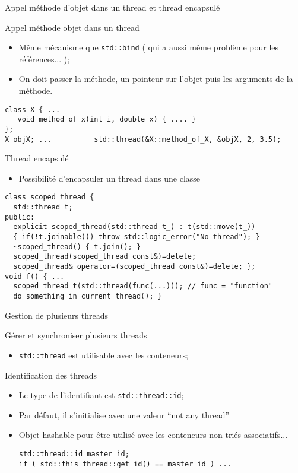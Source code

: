\documentclass[handout,10pt]{beamer}
\newcommand{\includepartcode}[4][cpp]{

}
\begin{document}
\begin{frame}[fragile]{Appel méthode d'objet dans un thread et thread encapsulé}
\tiny
\begin{block}{Appel méthode objet dans un thread}
 \begin{itemize}
  \item Même mécanisme que \lstinline$std::bind$ ( qui a aussi même problème pour les références... );
  \item On doit passer la méthode, un pointeur sur l'objet puis les arguments de la méthode.
 \end{itemize}
\begin{lstlisting}
class X { ...
   void method_of_x(int i, double x) { .... }
};
X objX; ...          std::thread(&X::method_of_X, &objX, 2, 3.5);
\end{lstlisting}
\end{block}

\begin{block}{Thread encapsulé}
 \begin{itemize}
  \item Possibilité d'encapsuler un thread dans une classe
 \end{itemize}
\begin{lstlisting}
class scoped_thread {
  std::thread t;
public:
  explicit scoped_thread(std::thread t_) : t(std::move(t_)) 
  { if(!t.joinable()) throw std::logic_error("No thread"); }
  ~scoped_thread() { t.join(); }
  scoped_thread(scoped_thread const&)=delete;
  scoped_thread& operator=(scoped_thread const&)=delete; };
void f() { ...
  scoped_thread t(std::thread(func(...))); // func = "function"
  do_something_in_current_thread(); }
\end{lstlisting}
\end{block}
\end{frame}

\begin{frame}[fragile]{Gestion de plusieurs threads}
\tiny

\begin{block}{Gérer et synchroniser plusieurs threads}
\begin{itemize}
 \item \lstinline$std::thread$ est utilisable avec les conteneurs;
\end{itemize}
\includepartcode{hello_thread.cpp}{5}{11}
\end{block}


 \begin{block}{Identification des threads}
  \begin{itemize}
   \item Le type de l'identifiant est \lstinline$std::thread::id$;
   \item Par défaut, il s'initialise avec une valeur ``not any thread''
   \item Objet hashable pour être utilisé avec les conteneurs non triés associatifs...
\begin{lstlisting}
std::thread::id master_id;
if ( std::this_thread::get_id() == master_id ) ...
\end{lstlisting}
\end{itemize}
 \end{block}
\end{frame}
\end{document}
